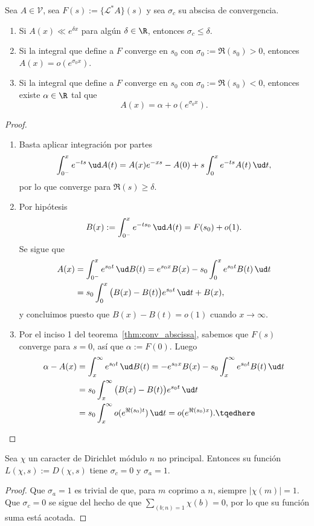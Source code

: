 \documentclass[teoria-numeros.tex]{subfiles}
\begin{document}
\begin{thm}
	Sea $A \in \mathcal{V}$, sea $F(s) := \{ \mathcal{L}^*A \}(s)$ y sea $\sigma_c$ su abscisa de convergencia.
	\begin{enumerate}
		\item Si $A(x) \ll e^{\delta x}$ para algún $\delta \in \R$, entonces $\sigma_c \le \delta$.
		\item Si la integral que define a $F$ converge en $s_0$ con $\sigma_0 := \Re(s_0) > 0$, entonces $A(x) = o(e^{\sigma_0 x})$.
		\item Si la integral que define a $F$ converge en $s_0$ con $\sigma_0 := \Re(s_0) < 0$, entonces existe $\alpha \in \R$ tal que
			\[
				A(x) = \alpha + o(e^{\sigma_0 x}).
			\]
	\end{enumerate}
\end{thm}
\begin{proof}
	\begin{enumerate}
		\item Basta aplicar integración por partes
			\[
				\int_{0^-}^x e^{-ts} \, \ud A(t) = A(x)e^{-xs} - A(0) + s\int_{0}^{x} e^{-ts}A(t) \, \ud t,
			\]
			por lo que converge para $\Re(s) \ge \delta$.
		\item Por hipótesis
			\[
				B(x) := \int_{0^-}^{x} e^{-ts_0} \, \ud A(t) = F(s_0) + o(1).
			\]
			Se sigue que
			\begin{align*}
				A(x) &= \int_{0^-}^{x} e^{s_0 t} \, \ud B(t) = e^{s_0x} B(x) - s_0 \int_{0}^{x} e^{s_0t}B(t) \, \ud t \\
				     &= s_0\int_{0}^{x} \big( B(x) - B(t) \big) e^{s_0t} \, \ud t + B(x),
			\end{align*}
			y concluimos puesto que $B(x) - B(t) = o(1)$ cuando $x \to \infty$.
		\item Por el inciso 1 del teorema~\ref{thm:conv_abscissa}, sabemos que $F(s)$ converge para $s = 0$, así que $\alpha := F(0)$.
			Luego
			\begin{align*}
				\alpha - A(x) &= \int_{x}^{\infty} e^{s_0t} \, \ud B(t) = -e^{s_0x}B(x) - s_0 \int_{x}^{\infty} e^{s_0 t}B(t) \, \ud t \\
					      &= s_0 \int_{x}^{\infty} \big( B(x) - B(t) \big) e^{s_0t} \, \ud t \\
					      &= s_0 \int_{x}^{\infty} o(e^{\Re(s_0)t}) \, \ud t
					      = o(e^{\Re(s_0)x}).
					      \tqedhere
			\end{align*}
	\end{enumerate}
\end{proof}
\begin{cor}
	Sea $\chi$ un caracter de Dirichlet módulo $n$ no principal.
	Entonces su función $L(\chi, s) := D(\chi, s)$ tiene $\sigma_c = 0$ y $\sigma_a = 1$.
\end{cor}
\begin{proof}
	Que $\sigma_a = 1$ es trivial de que, para $m$ coprimo a $n$, siempre $|\chi(m)| = 1$.
	Que $\sigma_c = 0$ se sigue del hecho de que $\sum_{(b; n) = 1} \chi(b) = 0$, por lo que su función suma está acotada.
\end{proof}
\end{document}
